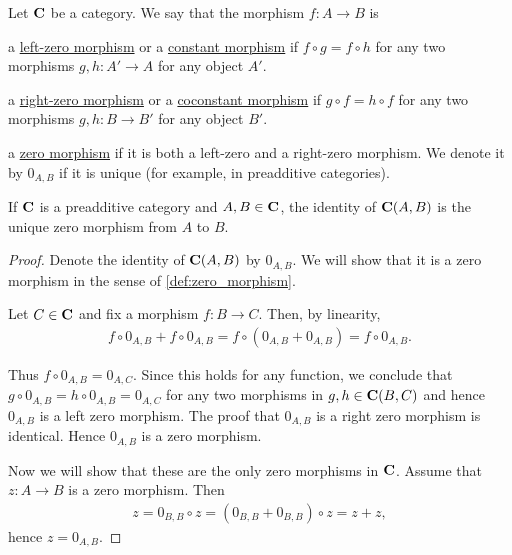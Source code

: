 \begin{definition}\label{def:zero_morphism}
  Let $\operatorname{\mathbf{C}}$ be a category. We say that the morphism $f: A \to B$ is
  \begin{defenum}
    \item\label{def:zero_morphism/left} a \ul{left-zero morphism} or a \ul{constant morphism} if $f \circ g = f \circ h$ for any two morphisms $g, h: A' \to A$ for any object $A'$.
    \item\label{def:zero_morphism/right} a \ul{right-zero morphism} or a \ul{coconstant morphism} if $g \circ f = h \circ f$ for any two morphisms $g, h: B \to B'$ for any object $B'$.
    \item\label{def:zero_morphism/bidirectional} a \ul{zero morphism} if it is both a left-zero and a right-zero morphism. We denote it by $0_{A,B}$ if it is unique (for example, in preadditive categories).
  \end{defenum}
\end{definition}

\begin{proposition}\label{def:preadditive_zero_morphisms}
  If $\operatorname{\mathbf{C}}$ is a preadditive category and $A, B \in \operatorname{\mathbf{C}}$, the identity of $\operatorname{\mathbf{C}}(A, B)$ is the unique zero morphism from $A$ to $B$.
\end{proposition}
\begin{proof}
  Denote the identity of $\operatorname{\mathbf{C}}(A, B)$ by $0_{A,B}$. We will show that it is a zero morphism in the sense of \cref{def:zero_morphism}.

  Let $C \in \operatorname{\mathbf{C}}$ and fix a morphism $f: B \to C$. Then, by linearity,
  \begin{align*}
    f \circ 0_{A,B} + f \circ 0_{A,B}
    =
    f \circ (0_{A,B} + 0_{A,B})
    =
    f \circ 0_{A,B}.
  \end{align*}

  Thus $f \circ 0_{A,B} = 0_{A,C}$. Since this holds for any function, we conclude that $g \circ 0_{A,B} = h \circ 0_{A,B} = 0_{A,C}$ for any two morphisms in $g, h \in \operatorname{\mathbf{C}}(B,C)$ and hence $0_{A,B}$ is a left zero morphism. The proof that $0_{A,B}$ is a right zero morphism is identical. Hence $0_{A,B}$ is a zero morphism.

  Now we will show that these are the only zero morphisms in $\operatorname{\mathbf{C}}$. Assume that $z: A \to B$ is a zero morphism. Then
  \begin{align*}
    z = 0_{B,B} \circ z = (0_{B,B} + 0_{B,B}) \circ z = z + z,
  \end{align*}
  hence $z = 0_{A,B}$.
\end{proof}

